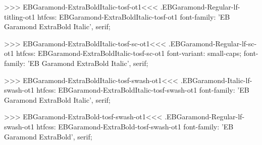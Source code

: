 {{{{{{{>>>
\<EBGaramond-ExtraBoldItalic-tosf-ot1\><<<
.EBGaramond-Regular-lf-titling-ot1
htfcss:  EBGaramond-ExtraBoldItalic-tosf-ot1  font-family: 'EB Garamond ExtraBold Italic', serif;

>>>
\<EBGaramond-ExtraBoldItalic-tosf-sc-ot1\><<<
.EBGaramond-Regular-lf-sc-ot1
htfcss:  EBGaramond-ExtraBoldItalic-tosf-sc-ot1  font-variant: small-caps; font-family: 'EB Garamond ExtraBold Italic', serif;

>>>
\<EBGaramond-ExtraBoldItalic-tosf-swash-ot1\><<<
.EBGaramond-Italic-lf-swash-ot1
htfcss:  EBGaramond-ExtraBoldItalic-tosf-swash-ot1  font-family: 'EB Garamond ExtraBold Italic', serif;

>>>
\<EBGaramond-ExtraBold-tosf-swash-ot1\><<<
.EBGaramond-Regular-lf-swash-ot1
htfcss:  EBGaramond-ExtraBold-tosf-swash-ot1  font-family: 'EB Garamond ExtraBold', serif;

}}}}}}}
